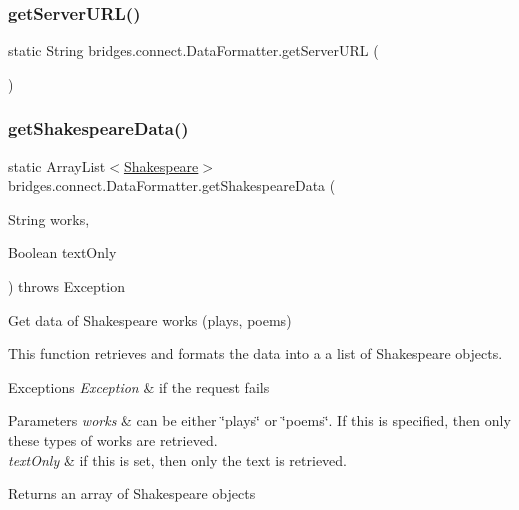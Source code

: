 \subsubsection{\texorpdfstring{get\+Server\+U\+R\+L()}{getServerURL()}}
{\footnotesize\ttfamily static String bridges.\+connect.\+Data\+Formatter.\+get\+Server\+U\+RL (\begin{DoxyParamCaption}{ }\end{DoxyParamCaption})\hspace{0.3cm}{\ttfamily [static]}}

\mbox{\label{classbridges_1_1connect_1_1_data_formatter_ac090a4d67b38b9649bf811906f9a630a}} 
\subsubsection{\texorpdfstring{get\+Shakespeare\+Data()}{getShakespeareData()}}
{\footnotesize\ttfamily static Array\+List$<$\mbox{\hyperlink{classbridges_1_1data__src__dependent_1_1_shakespeare}{Shakespeare}}$>$ bridges.\+connect.\+Data\+Formatter.\+get\+Shakespeare\+Data (\begin{DoxyParamCaption}\item[{String}]{works,  }\item[{Boolean}]{text\+Only }\end{DoxyParamCaption}) throws Exception\hspace{0.3cm}{\ttfamily [static]}}

Get data of Shakespeare works (plays, poems)

This function retrieves and formats the data into a a list of Shakespeare objects.


\begin{DoxyExceptions}{Exceptions}
{\em Exception} & if the request fails\\
\hline
\end{DoxyExceptions}

\begin{DoxyParams}{Parameters}
{\em works} & can be either \char`\"{}plays\char`\"{} or \char`\"{}poems\char`\"{}. If this is specified, then only these types of works are retrieved. \\
\hline
{\em text\+Only} & if this is set, then only the text is retrieved. \\
\hline
\end{DoxyParams}
\begin{DoxyReturn}{Returns}
an array of Shakespeare objects 
\end{DoxyReturn}
\mbox{\label{classbridges_1_1connect_1_1_data_formatter_ad1d2071025ce9daa42ab69af8eb4749b}} 
